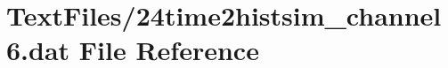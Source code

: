 \hypertarget{24time2histsim__channel6_8dat}{}\section{Text\+Files/24time2histsim\+\_\+channel6.dat File Reference}
\label{24time2histsim__channel6_8dat}
